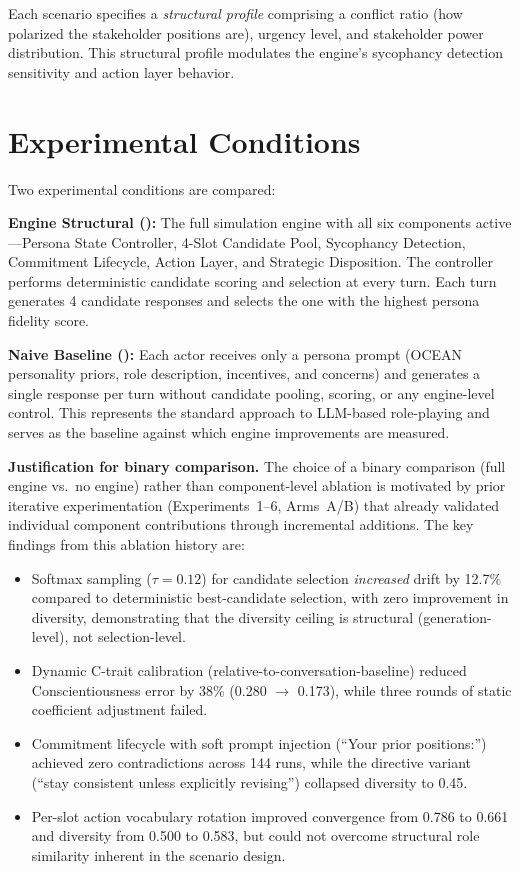 Each scenario specifies a \textit{structural profile} comprising a conflict ratio (how polarized the stakeholder positions are), urgency level, and stakeholder power distribution. This structural profile modulates the engine's sycophancy detection sensitivity and action layer behavior.


\section{Experimental Conditions}

Two experimental conditions are compared:

\textbf{Engine Structural (\engine):} The full simulation engine with all six components active---Persona State Controller, 4-Slot Candidate Pool, Sycophancy Detection, Commitment Lifecycle, Action Layer, and Strategic Disposition. The controller performs deterministic candidate scoring and selection at every turn. Each turn generates 4 candidate responses and selects the one with the highest persona fidelity score.

\textbf{Naive Baseline (\naive):} Each actor receives only a persona prompt (OCEAN personality priors, role description, incentives, and concerns) and generates a single response per turn without candidate pooling, scoring, or any engine-level control. This represents the standard approach to LLM-based role-playing and serves as the baseline against which engine improvements are measured.

\textbf{Justification for binary comparison.} The choice of a binary comparison (full engine vs.\ no engine) rather than component-level ablation is motivated by prior iterative experimentation (Experiments~1--6, Arms~A/B) that already validated individual component contributions through incremental additions. The key findings from this ablation history are:

\begin{itemize}[leftmargin=*, itemsep=1pt]
    \item Softmax sampling ($\tau=0.12$) for candidate selection \textit{increased} drift by 12.7\% compared to deterministic best-candidate selection, with zero improvement in diversity, demonstrating that the diversity ceiling is structural (generation-level), not selection-level.
    \item Dynamic C-trait calibration (relative-to-conversation-baseline) reduced Conscientiousness error by 38\% (0.280 $\to$ 0.173), while three rounds of static coefficient adjustment failed.
    \item Commitment lifecycle with soft prompt injection (``Your prior positions:'') achieved zero contradictions across 144 runs, while the directive variant (``stay consistent unless explicitly revising'') collapsed diversity to 0.45.
    \item Per-slot action vocabulary rotation improved convergence from 0.786 to 0.661 and diversity from 0.500 to 0.583, but could not overcome structural role similarity inherent in the scenario design.
\end{itemize}

